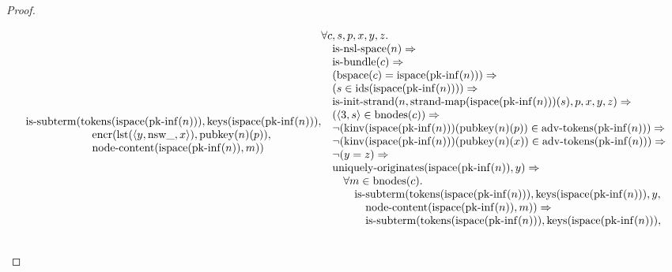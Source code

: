 \documentclass[11pt]{article}
\theoremstyle{plain}
\begin{document}
\begin{proof}
\begin{itemize}[leftmargin=2.8em, itemsep=4pt, parsep=1pt]
\begin{itemize}[leftmargin=2.8em, itemsep=4pt, parsep=1pt]
\begin{equation*}
\begin{array}{@{}l@{}}
\operatorname{is\text{-}subterm}(\operatorname{tokens}(\operatorname{ispace}(\operatorname{pk\text{-}inf}(n))), \operatorname{keys}(\operatorname{ispace}(\operatorname{pk\text{-}inf}(n))), \\ \quad \quad \quad \quad \quad \quad \operatorname{encr}(\operatorname{lst}(\langle y, \operatorname{nsw\_}, x \rangle), \operatorname{pubkey}(n)(p)), \\ \quad \quad \quad \quad \quad \quad \operatorname{node\text{-}content}(\operatorname{ispace}(\operatorname{pk\text{-}inf}(n)), m)) \end{array} \\
\begin{array}{@{}l@{}} \forall c, s, p, x, y, z. \\ \quad \operatorname{is\text{-}nsl\text{-}space}(n) \Rightarrow  \\ \quad \operatorname{is\text{-}bundle}(c) \Rightarrow  \\ \quad (\operatorname{bspace}(c) = \operatorname{ispace}(\operatorname{pk\text{-}inf}(n))) \Rightarrow  \\ \quad (s \in \operatorname{ids}(\operatorname{ispace}(\operatorname{pk\text{-}inf}(n)))) \Rightarrow  \\ \quad \operatorname{is\text{-}init\text{-}strand}(n, \operatorname{strand\text{-}map}(\operatorname{ispace}(\operatorname{pk\text{-}inf}(n)))(s), p, x, y, z) \Rightarrow  \\ \quad (\langle 3, s \rangle \in \operatorname{bnodes}(c)) \Rightarrow  \\ \quad \neg (\operatorname{kinv}(\operatorname{ispace}(\operatorname{pk\text{-}inf}(n)))(\operatorname{pubkey}(n)(p)) \in \operatorname{adv\text{-}tokens}(\operatorname{pk\text{-}inf}(n))) \Rightarrow  \\ \quad \neg (\operatorname{kinv}(\operatorname{ispace}(\operatorname{pk\text{-}inf}(n)))(\operatorname{pubkey}(n)(x)) \in \operatorname{adv\text{-}tokens}(\operatorname{pk\text{-}inf}(n))) \Rightarrow  \\ \quad \neg (y = z) \Rightarrow  \\ \quad \operatorname{uniquely\text{-}originates}(\operatorname{ispace}(\operatorname{pk\text{-}inf}(n)), y) \Rightarrow  \\ \quad \quad \forall m \in \operatorname{bnodes}(c). \\ \quad \quad \quad \operatorname{is\text{-}subterm}(\operatorname{tokens}(\operatorname{ispace}(\operatorname{pk\text{-}inf}(n))), \operatorname{keys}(\operatorname{ispace}(\operatorname{pk\text{-}inf}(n))), y, \\ \quad \quad \quad \quad \operatorname{node\text{-}content}(\operatorname{ispace}(\operatorname{pk\text{-}inf}(n)), m)) \Rightarrow \\ \quad \quad \quad \quad \operatorname{is\text{-}subterm}(\operatorname{tokens}(\operatorname{ispace}(\operatorname{pk\text{-}inf}(n))), \operatorname{keys}(\operatorname{ispace}(\operatorname{pk\text{-}inf}(n))), \\ \quad \quad \quad \quad 
\end{array}
\end{equation*}
\end{itemize}
\end{itemize}
\end{proof}
\end{document}
